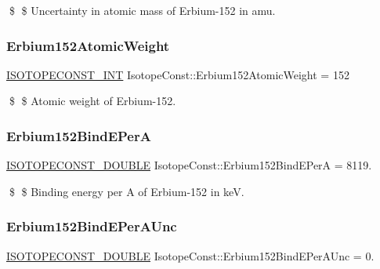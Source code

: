 \$ \$ Uncertainty in atomic mass of Erbium-\/152 in amu. \mbox{\label{group___isotope_const-_erbium-_er152_ga876a4713f45dc47f8dca63a93e5901ef}} 
\subsubsection{\texorpdfstring{Erbium152\+Atomic\+Weight}{Erbium152AtomicWeight}}
{\footnotesize\ttfamily \mbox{\hyperlink{group___isotope_const-_macros_ga5f18360b3e99483a35c32d789e62621c}{I\+S\+O\+T\+O\+P\+E\+C\+O\+N\+S\+T\+\_\+\+I\+NT}} Isotope\+Const\+::\+Erbium152\+Atomic\+Weight = 152}

\$ \$ Atomic weight of Erbium-\/152. \mbox{\label{group___isotope_const-_erbium-_er152_ga1ed98586cf9a58576e487ccf696a3695}} 
\subsubsection{\texorpdfstring{Erbium152\+Bind\+E\+PerA}{Erbium152BindEPerA}}
{\footnotesize\ttfamily \mbox{\hyperlink{group___isotope_const-_macros_ga8f45a7272ce02c0b4c65c44636ed719a}{I\+S\+O\+T\+O\+P\+E\+C\+O\+N\+S\+T\+\_\+\+D\+O\+U\+B\+LE}} Isotope\+Const\+::\+Erbium152\+Bind\+E\+PerA = 8119.}

\$ \$ Binding energy per A of Erbium-\/152 in keV. \mbox{\label{group___isotope_const-_erbium-_er152_ga88fa2729d9c793e99412fe0572e9a566}} 
\subsubsection{\texorpdfstring{Erbium152\+Bind\+E\+Per\+A\+Unc}{Erbium152BindEPerAUnc}}
{\footnotesize\ttfamily \mbox{\hyperlink{group___isotope_const-_macros_ga8f45a7272ce02c0b4c65c44636ed719a}{I\+S\+O\+T\+O\+P\+E\+C\+O\+N\+S\+T\+\_\+\+D\+O\+U\+B\+LE}} Isotope\+Const\+::\+Erbium152\+Bind\+E\+Per\+A\+Unc = 0.}


